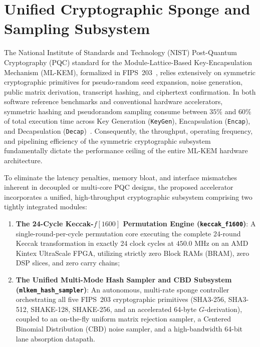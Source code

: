 
\section{Unified Cryptographic Sponge and Sampling Subsystem}
\label{sec:keccak_sampler}

The National Institute of Standards and Technology (NIST) Post-Quantum Cryptography (PQC) standard for the Module-Lattice-Based Key-Encapsulation Mechanism (\mbox{ML-KEM}), formalized in FIPS~203~\cite{fips203}, relies extensively on symmetric cryptographic primitives for pseudo-random seed expansion, noise generation, public matrix derivation, transcript hashing, and ciphertext confirmation. In both software reference benchmarks and conventional hardware accelerators, symmetric hashing and pseudorandom sampling consume between $35\%$ and $60\%$ of total execution time across Key Generation (\texttt{KeyGen}), Encapsulation (\texttt{Encap}), and Decapsulation (\texttt{Decap})~\cite{fips203, fips202}. Consequently, the throughput, operating frequency, and pipelining efficiency of the symmetric cryptographic subsystem fundamentally dictate the performance ceiling of the entire \mbox{ML-KEM} hardware architecture.

To eliminate the latency penalties, memory bloat, and interface mismatches inherent in decoupled or multi-core PQC designs, the proposed accelerator incorporates a unified, high-throughput cryptographic subsystem comprising two tightly integrated modules:
\begin{enumerate}
    \item \textbf{The 24-Cycle Keccak-$f[1600]$ Permutation Engine (\texttt{keccak\_f1600})}: A single-round-per-cycle permutation core executing the complete 24-round Keccak transformation in exactly 24 clock cycles at $450.0\text{ MHz}$ on an AMD Kintex UltraScale FPGA, utilizing strictly zero Block RAMs (BRAM), zero DSP slices, and zero carry chains;
    \item \textbf{The Unified Multi-Mode Hash Sampler and CBD Subsystem (\texttt{mlkem\_hash\_sampler})}: An autonomous, multi-rate sponge controller orchestrating all five FIPS~203 cryptographic primitives (SHA3-256, SHA3-512, SHAKE-128, SHAKE-256, and an accelerated 64-byte $G$-derivation), coupled to an on-the-fly uniform matrix rejection sampler, a Centered Binomial Distribution (\mbox{CBD}) noise sampler, and a high-bandwidth 64-bit lane absorption datapath.
\end{enumerate}

